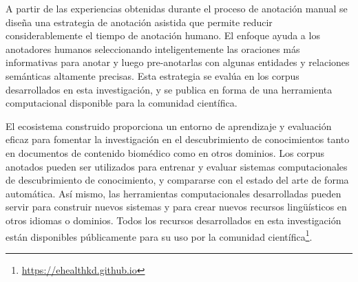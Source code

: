 A partir de las experiencias obtenidas durante el proceso de anotación manual se diseña una estrategia de anotación asistida que permite reducir considerablemente el tiempo de anotación humano. 
El enfoque ayuda a los anotadores humanos seleccionando inteligentemente las oraciones más informativas para anotar y luego pre-anotarlas con algunas entidades y relaciones semánticas altamente precisas.
Esta estrategia se evalúa en los corpus desarrollados en esta investigación, y se publica en forma de una herramienta computacional disponible para la comunidad científica.

El ecosistema construido proporciona un entorno de aprendizaje y evaluación eficaz para fomentar la investigación en el descubrimiento de conocimientos tanto en documentos de contenido biomédico como en otros dominios. Los corpus anotados pueden ser utilizados para entrenar y evaluar sistemas computacionales de descubrimiento de conocimiento, y compararse con el estado del arte de forma automática. Así mismo, las herramientas computacionales desarrolladas pueden servir para construir nuevos sistemas y para crear nuevos recursos lingüísticos en otros idiomas o dominios. Todos los recursos desarrollados en esta investigación están disponibles públicamente para su uso por la comunidad científica\footnote{\url{https://ehealthkd.github.io}}.
